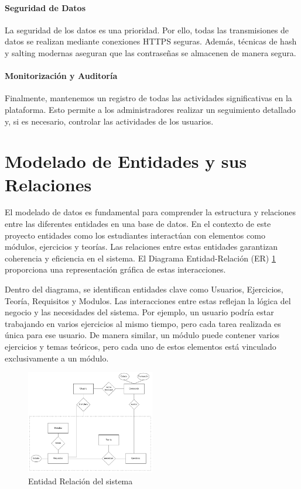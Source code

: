 \paragraph{Seguridad de Datos}
La seguridad de los datos es una prioridad. Por ello, todas las transmisiones de datos se realizan mediante conexiones HTTPS seguras. Además, técnicas de hash y salting modernas aseguran que las contraseñas se almacenen de manera segura.

\paragraph{Monitorización y Auditoría}
Finalmente, mantenemos un registro de todas las actividades significativas en la plataforma. Esto permite a los administradores realizar un seguimiento detallado y, si es necesario, controlar las actividades de los usuarios.

\section{Modelado de Entidades y sus Relaciones}

El modelado de datos es fundamental para comprender la estructura y relaciones entre las diferentes entidades en una base de datos. En el contexto de este proyecto  entidades como los estudiantes interactúan con elementos como módulos, ejercicios y teorías. Las relaciones entre estas entidades garantizan coherencia y eficiencia en el sistema. El Diagrama Entidad-Relación (ER) \ref{fig:er} proporciona una representación gráfica de estas interacciones. 

Dentro del diagrama, se identifican entidades clave como Usuarios, Ejercicios, Teoría, Requisitos y Modulos. Las interacciones entre estas reflejan la lógica del negocio y las necesidades del sistema. Por ejemplo, un usuario podría estar trabajando en varios ejercicios al mismo tiempo, pero cada tarea realizada es única para ese usuario. De manera similar, un módulo puede contener varios ejercicios y temas teóricos, pero cada uno de estos elementos está vinculado exclusivamente a un módulo.


\begin{figure}[H]
    \centering
    \includegraphics[width=0.5\textwidth]{imagenes/Entidad-Relacion.png}
    \caption{Entidad Relación del sistema}
    \label{fig:er}
\end{figure}